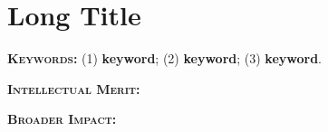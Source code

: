 
\def\thetitle{Long Title}
\def\shorttitle{Title}
\def\theauthors{PI: \uline{Geoffrey Challen}\\\textit{SUNY Buffalo}}
\def\shortauthors{Challen}
\def\submissiondate{\today}

\chapter{\thetitle}

\textbf{\textsc{Keywords:}} (1) \textbf{keyword}; (2) \textbf{keyword}; (3)
\textbf{keyword}.

\textbf{\textsc{Intellectual Merit:}}

\textbf{\textsc{Broader Impact:}}
